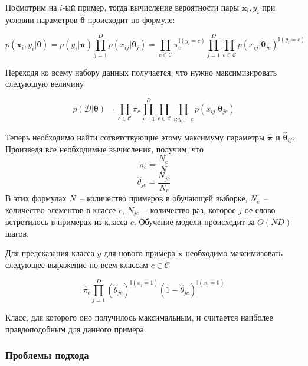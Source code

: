 Посмотрим на $i$-ый пример, тогда вычисление вероятности пары $\mathbf{x}_i, y_i$ при условии
параметров $\mathbf{\theta}$ происходит по формуле:

\begin{equation}
  p(\mathbf{x}_i, y_i|\mathbf{\theta})
  = p(y_i|\mathbf{\pi})\prod_{j=1}^Dp(x_{ij}|\mathbf{\theta}_j)
  = \prod_{c\in\mathcal{C}}\pi_c^{\mathbb{I}(y_i=c)}
    \prod_{j=1}^D\prod_{c\in\mathcal{C}}p(x_{ij}|\mathbf{\theta}_{jc})^{\mathbb{I}(y_i=c)}
  \label{eq:mle}
\end{equation}

Переходя ко всему набору данных получается, что нужно максимизировать следующую величину

\begin{equation}
  p(\mathcal{D}|\mathbf{\theta})
  = \prod_{c\in\mathcal{C}}\pi_c
    \prod_{j=1}^D\prod_{c\in\mathcal{C}}\prod_{i:y_i=c}p(x_{ij}|\mathbf{\theta}_{jc})
  \label{eq:mleD}
\end{equation}

Теперь необходимо найти сответствующие этому максимуму параметры $\hat{\mathbf{\pi}}$
и $\hat{\mathbf{\theta}}_{ij}$. Произведя
все необходимые вычисления, получим, что
\begin{equation}
  \hat{\pi}_c = \frac{N_c}{N}
  \label{eq:pinb}
\end{equation}
\begin{equation}
  \hat{\theta}_{jc}= \frac{N_{jc}}{N_c}
  \label{eq:thetanb}
\end{equation}
В этих формулах $N$~-- количество примеров в обучающей выборке, $N_c$~--количество элементов в
классе $c$,
$N_{jc}$~-- количество раз, которое $j$-ое слово встретилось в примерах из класса $c$. Обучение
модели происходит за $O(ND)$ шагов.

Для предсказания класса $y$ для нового примера $\mathbf{x}$ необходимо максимизовать следующее
выражение по всем классам $c \in \mathcal{C}$

\begin{equation}
  \hat{\pi}_c\prod_{j=1}^D(\hat{\theta}_{jc})^{\mathbb{I}(x_j=1)}(1-\hat{\theta}_{jc})^{\mathbb{I}(x_j=0)}
  \label{eq:predict}
\end{equation}

Класс, для которого оно получилось максимальным, и считается наиболее правдоподобным для данного
примера.

\subsubsection{Проблемы подхода}

